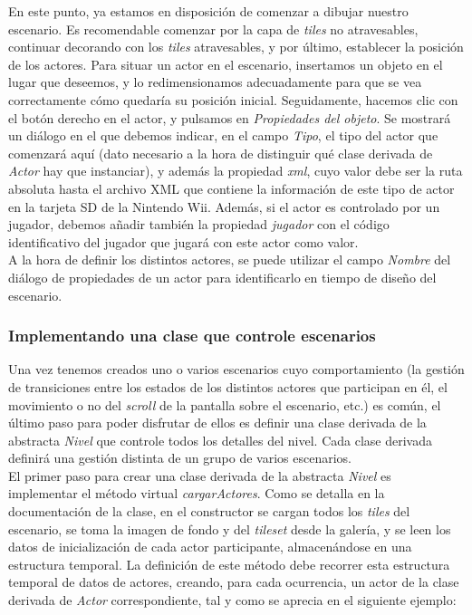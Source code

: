 En este punto, ya estamos en disposición de comenzar a dibujar nuestro escenario. Es recomendable comenzar por la capa de \emph{tiles} no atravesables, continuar decorando con los \emph{tiles} atravesables, y por último, establecer la posición de los actores. Para situar un actor en el escenario, insertamos un objeto en el lugar que deseemos, y lo redimensionamos adecuadamente para que se vea correctamente cómo quedaría su posición inicial. Seguidamente, hacemos clic con el botón derecho en el actor, y pulsamos en \emph{Propiedades del objeto}. Se mostrará un diálogo en el que debemos indicar, en el campo \emph{Tipo}, el tipo del actor que comenzará aquí (dato necesario a la hora de distinguir qué clase derivada de \emph{Actor} hay que instanciar), y además la propiedad \emph{xml}, cuyo valor debe ser la ruta absoluta hasta el archivo XML que contiene la información de este tipo de actor en la tarjeta SD de la Nintendo Wii. Además, si el actor es controlado por un jugador, debemos añadir también la propiedad \emph{jugador} con el código identificativo del jugador que jugará con este actor como valor.\\

A la hora de definir los distintos actores, se puede utilizar el campo \emph{Nombre} del diálogo de propiedades de un actor para identificarlo en tiempo de diseño del escenario.

\subsubsection{Implementando una clase que controle escenarios}

Una vez tenemos creados uno o varios escenarios cuyo comportamiento (la gestión de transiciones entre los estados de los distintos actores que participan en él, el movimiento o no del \emph{scroll} de la pantalla sobre el escenario, etc.) es común, el último paso para poder disfrutar de ellos es definir una clase derivada de la abstracta \emph{Nivel} que controle todos los detalles del nivel. Cada clase derivada definirá una gestión distinta de un grupo de varios escenarios.\\

El primer paso para crear una clase derivada de la abstracta \emph{Nivel} es implementar el método virtual \emph{cargarActores}. Como se detalla en la documentación de la clase, en el constructor se cargan todos los \emph{tiles} del escenario, se toma la imagen de fondo y del \emph{tileset} desde la galería, y se leen los datos de inicialización de cada actor participante, almacenándose en una estructura temporal. La definición de este método debe recorrer esta estructura temporal de datos de actores, creando, para cada ocurrencia, un actor de la clase derivada de \emph{Actor} correspondiente, tal y como se aprecia en el siguiente ejemplo:

